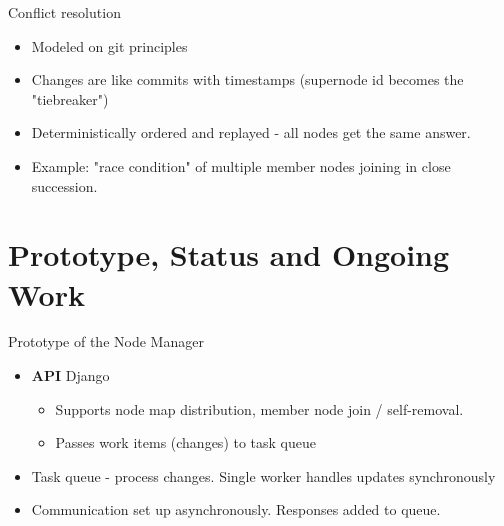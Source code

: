 \documentclass{beamer}
\begin{document}
%
%
%




\begin{frame}{Conflict resolution}
\begin{itemize}
\item
Modeled on git principles
\item
Changes are like commits with timestamps (supernode id becomes the "tiebreaker")
\item 
Deterministically ordered and replayed - all nodes get the same answer.
\item
Example: "race condition" of multiple member nodes joining in close succession. 

\end{itemize}



\end{frame}

\section{Prototype, Status and Ongoing Work}
\begin{frame}{Prototype of the Node Manager}
\begin{itemize}
\item
\textbf{API} Django
\begin{itemize}
 \item Supports node map distribution, member node join / self-removal.
\item
Passes work items (changes) to task queue
\end{itemize}
\item Task queue  - process changes.  Single worker handles updates synchronously

\item
Communication set up asynchronously. Responses added to queue.  

\end{itemize}

\end{frame}
\end{document}
